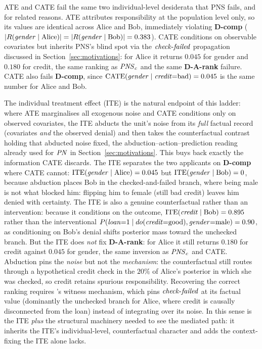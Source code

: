 ATE and CATE fail the same two individual-level desiderata that PNS fails, and
for related reasons.
ATE attributes responsibility at the population level only, so its
values are identical across Alice and Bob, immediately violating \textbf{D-comp}
($|R(\varname{gender}\mid\text{Alice})| = |R(\varname{gender}\mid\text{Bob})| = 0.383$).
CATE conditions on observable covariates but inherits PNS's blind spot via the
$\varname{check\text{-}failed}$ propagation discussed in Section~\ref{sec:motivations}:
for Alice it returns $0.045$ for gender and $0.180$ for credit, the same
ranking as $\mathit{PNS}_c$ and the same \textbf{D-A-rank} failure.
CATE also fails \textbf{D-comp}, since
$\mathrm{CATE}(\varname{gender}\mid\varname{credit}{=}\text{bad}) = 0.045$ is the same number
for Alice and Bob.

The individual treatment effect (ITE) is the natural endpoint of this ladder:
where ATE marginalises all exogenous noise and CATE conditions only on observed
covariates, the ITE abducts the unit's noise from its \emph{full} factual record
(covariates \emph{and} the observed denial) and then takes the
counterfactual contrast holding that abducted noise fixed, the
abduction--action--prediction reading already used for $\mathit{PN}$ in
Section~\ref{sec:motivations}. This buys back exactly the information CATE
discards. The ITE separates the two applicants on \textbf{D-comp} where CATE
cannot: $\mathrm{ITE}(\varname{gender}\mid\text{Alice}) = 0.045$ but
$\mathrm{ITE}(\varname{gender}\mid\text{Bob}) = 0$, because abduction places Bob
in the checked-and-failed branch, where being male is not what blocked him:
flipping him to female (still bad credit) leaves him denied with certainty.
The ITE is also a genuine counterfactual rather than an intervention: because it
conditions on the outcome, $\mathrm{ITE}(\varname{credit}\mid\text{Bob}) = 0.895$
rather than the interventional $P(\varname{loan}{=}1\mid do(\varname{credit}{=}\text{good}),\varname{gender}{=}\text{male}) = 0.90$,
as conditioning on Bob's denial shifts posterior mass toward the unchecked branch.
But the ITE does \emph{not} fix \textbf{D-A-rank}: for Alice it still returns
$0.180$ for credit against $0.045$ for gender, the same inversion as $\mathit{PNS}_c$ and
CATE. Abduction pins the \emph{noise} but not the \emph{mechanism}: the
counterfactual still routes through a hypothetical credit check in the $20\%$ of
Alice's posterior in which she was checked, so credit retains spurious
responsibility. Recovering the correct ranking requires \ourapproach's witness
mechanism, which pins $\varname{check\text{-}failed}$ at its factual value
(dominantly the unchecked branch for Alice, where credit is causally
disconnected from the loan) instead of integrating over its noise. In
this sense \ourapproach is the ITE \emph{plus} the structural machinery needed to
see the mediated path: it inherits the ITE's individual-level, counterfactual
character and adds the context-fixing the ITE alone lacks.

